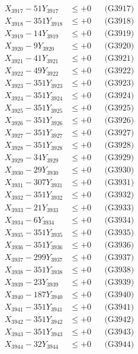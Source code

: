 \documentclass[a4paper,10pt]{article}
\begin{document}
{\begin{align}
X_{3917} - 51Y_{3917} &\leq +0 && \text{(G3917)} \\
X_{3918} - 351Y_{3918} &\leq +0 && \text{(G3918)} \\
X_{3919} - 14Y_{3919} &\leq +0 && \text{(G3919)} \\
X_{3920} - 9Y_{3920} &\leq +0 && \text{(G3920)} \\
\allowbreak
X_{3921} - 41Y_{3921} &\leq +0 && \text{(G3921)} \\
X_{3922} - 49Y_{3922} &\leq +0 && \text{(G3922)} \\
X_{3923} - 351Y_{3923} &\leq +0 && \text{(G3923)} \\
X_{3924} - 351Y_{3924} &\leq +0 && \text{(G3924)} \\
X_{3925} - 351Y_{3925} &\leq +0 && \text{(G3925)} \\
X_{3926} - 351Y_{3926} &\leq +0 && \text{(G3926)} \\
X_{3927} - 351Y_{3927} &\leq +0 && \text{(G3927)} \\
X_{3928} - 351Y_{3928} &\leq +0 && \text{(G3928)} \\
X_{3929} - 34Y_{3929} &\leq +0 && \text{(G3929)} \\
X_{3930} - 29Y_{3930} &\leq +0 && \text{(G3930)} \\
\allowbreak
X_{3931} - 307Y_{3931} &\leq +0 && \text{(G3931)} \\
X_{3932} - 351Y_{3932} &\leq +0 && \text{(G3932)} \\
X_{3933} - 21Y_{3933} &\leq +0 && \text{(G3933)} \\
X_{3934} - 6Y_{3934} &\leq +0 && \text{(G3934)} \\
X_{3935} - 351Y_{3935} &\leq +0 && \text{(G3935)} \\
X_{3936} - 351Y_{3936} &\leq +0 && \text{(G3936)} \\
X_{3937} - 299Y_{3937} &\leq +0 && \text{(G3937)} \\
X_{3938} - 351Y_{3938} &\leq +0 && \text{(G3938)} \\
X_{3939} - 23Y_{3939} &\leq +0 && \text{(G3939)} \\
X_{3940} - 187Y_{3940} &\leq +0 && \text{(G3940)} \\
\allowbreak
X_{3941} - 351Y_{3941} &\leq +0 && \text{(G3941)} \\
X_{3942} - 351Y_{3942} &\leq +0 && \text{(G3942)} \\
X_{3943} - 351Y_{3943} &\leq +0 && \text{(G3943)} \\
X_{3944} - 32Y_{3944} &\leq +0 && \text{(G3944)} \\

\end{align}}
\end{document}
